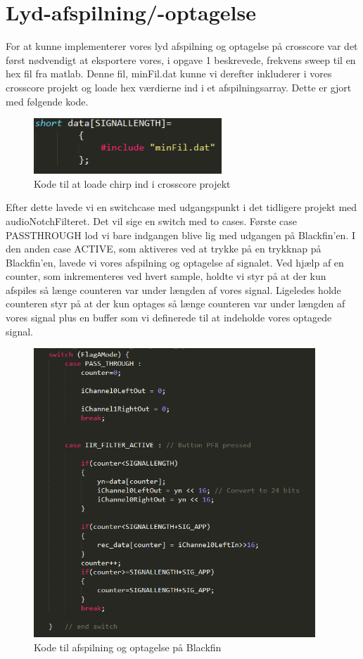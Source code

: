 \graphicspath{{Chapters/Opgave2/}}

\chapter{Lyd-afspilning/-optagelse}
For at kunne implementerer vores lyd afspilning og optagelse på crosscore var det først nødvendigt at eksportere vores, i opgave 1 beskrevede, frekvens sweep til en hex fil fra matlab. Denne fil, minFil.dat kunne vi derefter inkluderer i vores crosscore projekt og loade hex værdierne ind i et afspilningsarray. Dette er gjort med følgende kode.

\begin{figure}[H]
\centering
\includegraphics[width = 200pt]{Img/Inkluder.PNG}
\caption{Kode til at loade chirp ind i crosscore projekt}
\label{fig:Inkluder}
\end{figure}

Efter dette lavede vi en switchcase med udgangspunkt i det tidligere projekt med audioNotchFilteret. Det vil sige en switch med to cases. Første case PASSTHROUGH lod vi bare indgangen blive lig med udgangen på Blackfin'en. I den anden case ACTIVE, som aktiveres ved at trykke på en trykknap på Blackfin'en, lavede vi vores afspilning og optagelse af signalet. Ved hjælp af en counter, som inkrementeres ved hvert sample, holdte vi styr på at der kun afspiles så længe counteren var under længden af vores signal. Ligeledes holde counteren styr på at der kun optages så længe counteren var under længden af vores signal plus en buffer som vi definerede til at indeholde vores optagede signal.

\begin{figure}[H]
\centering
\includegraphics[width = 300pt]{Img/SwitchCase.PNG}
\caption{Kode til afspilning og optagelse på Blackfin}
\label{fig:SwitchCase}
\end{figure}

